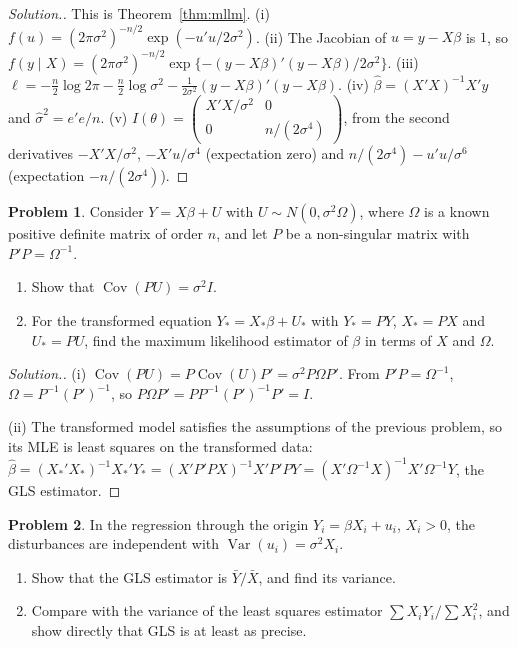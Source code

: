 \documentclass[11pt,a4paper]{article}
\numberwithin{equation}{section}
\DeclareMathOperator{\Var}{Var}
\DeclareMathOperator{\Cov}{Cov}
\theoremstyle{definition}
\newtheorem{problemx}{Problem}[subsection]
\newenvironment{problem}{\begin{problemx}}{\end{problemx}}
\newenvironment{solution}
  {\renewcommand{\qedsymbol}{}\begin{proof}[\textit{Solution}.]}
  {\end{proof}}
\begin{document}
\begin{solution}
This is Theorem~\ref{thm:mllm}. (i) $f(u) = (2\pi\sigma^2)^{-n/2}\exp(-u'u/2\sigma^2)$. (ii) The Jacobian of $u = y - X\beta$ is $1$, so
$f(y \mid X) = (2\pi\sigma^2)^{-n/2}\exp\{-(y - X\beta)'(y - X\beta)/2\sigma^2\}$. (iii) $\ell = -\frac n2\log2\pi - \frac n2\log\sigma^2 - \frac{1}{2\sigma^2}(y - X\beta)'(y - X\beta)$.
(iv) $\hat\beta = (X'X)^{-1}X'y$ and $\hat\sigma^2 = e'e/n$. (v)
$I(\theta) = \begin{pmatrix} X'X/\sigma^2 & 0 \\ 0 & n/(2\sigma^4) \end{pmatrix}$, from the second derivatives $-X'X/\sigma^2$, $-X'u/\sigma^4$ (expectation zero) and
$n/(2\sigma^4) - u'u/\sigma^6$ (expectation $-n/(2\sigma^4)$).
\end{solution}

\begin{problem}
Consider $Y = X\beta + U$ with $U \sim N(0, \sigma^2\Omega)$, where $\Omega$ is a known positive definite matrix of order $n$, and let $P$ be a non-singular matrix with
$P'P = \Omega^{-1}$.
\begin{enumerate}[label=(\roman*)]
\item Show that $\Cov(PU) = \sigma^2I$.
\item For the transformed equation $Y_* = X_*\beta + U_*$ with $Y_* = PY$, $X_* = PX$ and $U_* = PU$, find the maximum likelihood estimator of $\beta$ in terms of
$X$ and $\Omega$.
\end{enumerate}
\end{problem}

\begin{solution}
(i) $\Cov(PU) = P\Cov(U)P' = \sigma^2P\Omega P'$. From $P'P = \Omega^{-1}$, $\Omega = P^{-1}(P')^{-1}$, so $P\Omega P' = PP^{-1}(P')^{-1}P' = I$.

(ii) The transformed model satisfies the assumptions of the previous problem, so its MLE is least squares on the transformed data:
$\hat\beta = (X_*'X_*)^{-1}X_*'Y_* = (X'P'PX)^{-1}X'P'PY = (X'\Omega^{-1}X)^{-1}X'\Omega^{-1}Y$, the GLS estimator.
\end{solution}

\begin{problem}
In the regression through the origin $Y_i = \beta X_i + u_i$, $X_i > 0$, the disturbances are independent with $\Var(u_i) = \sigma^2X_i$.
\begin{enumerate}[label=(\alph*)]
\item Show that the GLS estimator is $\bar Y/\bar X$, and find its variance.
\item Compare with the variance of the least squares estimator $\sum X_iY_i/\sum X_i^2$, and show directly that GLS is at least as precise.
\end{enumerate}
\end{problem}
\end{document}
